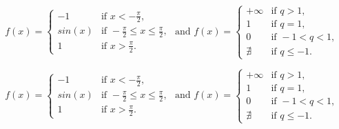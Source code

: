 \documentclass[a4paper, 11pt]{article}
\begin{document}
\[ 
    f(x) = \begin{cases}
    -1 & \text{if } x < -\frac{\pi}{2}, \\
    sin(x) & \text{if } -\frac{\pi}{2} \le x \le \frac{\pi}{2}, \\
    1 & \text{if } x > \frac{\pi}{2}.
    \end{cases} 
    \text{ and }
    f(x) = \begin{cases}
    +\infty & \text{if } q > 1, \\
    1 & \text{if } q = 1, \\
    0 & \text{if } -1 < q < 1, \\
    \nexists & \text{if } q \le -1.
    \end{cases} 
\]

\[ 
    f(x) = \left\{\begin{array}{lll}
    -1 & \text{if } x < -\frac{\pi}{2}, \\
    sin(x) & \text{if } -\frac{\pi}{2} \le x \le \frac{\pi}{2}, \\
    1 & \text{if } x > \frac{\pi}{2}.
    \end{array}\right. 
    \text{ and }
    f(x) = \left\{\begin{array}{llll}
    +\infty & \text{if } q > 1, \\
    1 & \text{if } q = 1, \\
    0 & \text{if } -1 < q < 1, \\
    \nexists & \text{if } q \le -1.
    \end{array}\right. 
\]
\end{document}
